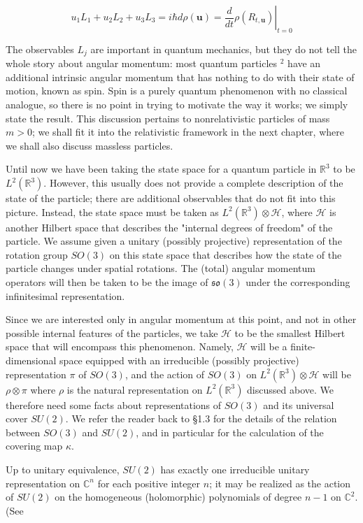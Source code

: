 \documentclass[10pt, letterpaper]{article}
\begin{document}
$$
u_{1} L_{1}+u_{2} L_{2}+u_{3} L_{3}=i \hbar d \rho(\mathbf{u})=\left.\frac{d}{d t} \rho\left(R_{t, \mathbf{u}}\right)\right|_{t=0}
$$

The observables $L_{j}$ are important in quantum mechanics, but they do not tell the whole story about angular momentum: most quantum particles ${ }^{2}$ have an additional intrinsic angular momentum that has nothing to do with their state of motion, known as spin. Spin is a purely quantum phenomenon with no classical analogue, so there is no point in trying to motivate the way it works; we simply state the result. This discussion pertains to nonrelativistic particles of mass $m>0$; we shall fit it into the relativistic framework in the next chapter, where we shall also discuss massless particles.

Until now we have been taking the state space for a quantum particle in $\mathbb{R}^{3}$ to be $L^{2}\left(\mathbb{R}^{3}\right)$. However, this usually does not provide a complete description of the state of the particle; there are additional observables that do not fit into this picture. Instead, the state space must be taken as $L^{2}\left(\mathbb{R}^{3}\right) \otimes \mathcal{H}$, where $\mathcal{H}$ is another Hilbert space that describes the "internal degrees of freedom" of the particle. We assume given a unitary (possibly projective) representation of the rotation group $S O(3)$ on this state space that describes how the state of the particle changes under spatial rotations. The (total) angular momentum operators will then be taken to be the image of $\mathfrak{s o}(3)$ under the corresponding infinitesimal representation.

Since we are interested only in angular momentum at this point, and not in other possible internal features of the particles, we take $\mathcal{H}$ to be the smallest Hilbert space that will encompass this phenomenon. Namely, $\mathcal{H}$ will be a finite-dimensional space equipped with an irreducible (possibly projective) representation $\pi$ of $S O(3)$, and the action of $S O(3)$ on $L^{2}\left(\mathbb{R}^{3}\right) \otimes \mathcal{H}$ will be $\rho \otimes \pi$ where $\rho$ is the natural representation on $L^{2}\left(\mathbb{R}^{3}\right)$ discussed above. We therefore need some facts about representations of $S O(3)$ and its universal cover $S U(2)$. We refer the reader back to §1.3 for the details of the relation between $S O(3)$ and $S U(2)$, and in particular for the calculation of the covering map $\kappa$.

Up to unitary equivalence, $S U(2)$ has exactly one irreducible unitary representation on $\mathbb{C}^{n}$ for each positive integer $n$; it may be realized as the action of $S U(2)$ on the homogeneous (holomorphic) polynomials of degree $n-1$ on $\mathbb{C}^{2}$. (See
\end{document}
